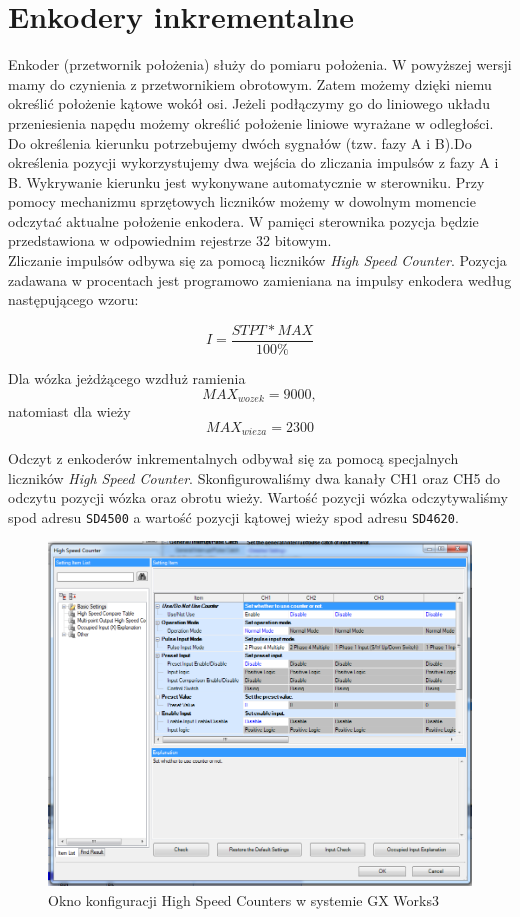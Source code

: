 \section{Enkodery inkrementalne}
\label{inteco_stanowisko_Enkodery}
Enkoder (przetwornik położenia) służy do pomiaru położenia. W powyższej wersji
mamy do czynienia z przetwornikiem obrotowym. Zatem możemy dzięki niemu określić
położenie kątowe wokół osi. Jeżeli podłączymy go do liniowego układu przeniesienia napędu
możemy określić położenie liniowe wyrażane w odległości.\\
\indent Do określenia kierunku potrzebujemy dwóch sygnałów (tzw.
fazy A i B).Do określenia pozycji wykorzystujemy dwa wejścia do zliczania 
impulsów z fazy A i B. Wykrywanie kierunku jest wykonywane
automatycznie w sterowniku. Przy pomocy mechanizmu sprzętowych liczników możemy w
dowolnym momencie odczytać aktualne położenie enkodera. W pamięci
sterownika pozycja będzie przedstawiona w odpowiednim rejestrze 32 bitowym.\\
\indent Zliczanie impulsów odbywa się za pomocą liczników \emph{High Speed Counter}.
Pozycja zadawana w procentach jest programowo zamieniana na impulsy enkodera 
według następującego wzoru:

$$ I = \frac{STPT * MAX}{100\%}$$

Dla wózka jeżdżącego wzdłuż ramienia $$MAX_{wozek} = 9000,$$
natomiast dla wieży $$MAX_{wieza} = 2300$$

Odczyt z enkoderów inkrementalnych odbywał się za pomocą specjalnych liczników \emph{High Speed
Counter}. Skonfigurowaliśmy dwa kanały CH1 oraz CH5 do odczytu pozycji wózka oraz obrotu wieży. 
Wartość pozycji wózka odczytywaliśmy spod adresu \texttt{SD4500} a wartość pozycji kątowej wieży 
spod adresu \texttt{SD4620}.

\begin{figure}[H]
    \label{PLC::Konfiguracja::HIOEN::WindowCH1}
    \centering
    \includegraphics[scale=0.35]{./sections/inteco/images/hioen.png}
    \caption{Okno konfiguracji High Speed Counters w systemie GX Works3}
\end{figure}
\newpage

